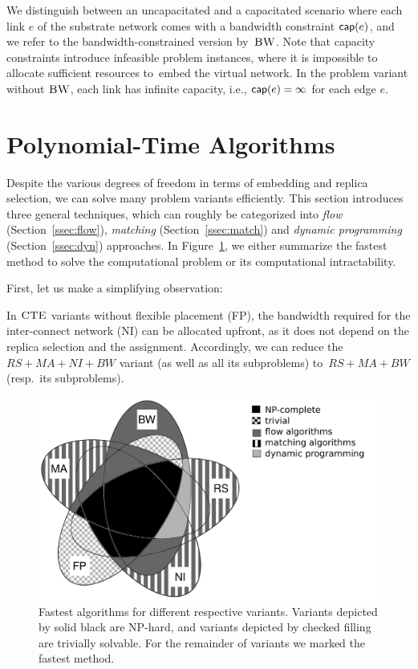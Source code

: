 We distinguish between an uncapacitated and a capacitated scenario where each link $e$
of the substrate network comes with a bandwidth
constraint $\textsf{cap}(e)$, and we refer to the bandwidth-constrained version by~$\textsc{BW}$.
Note that capacity constraints introduce infeasible problem instances, where it is impossible to
allocate sufficient resources to~embed the virtual network.
In the problem variant without $\textsc{BW}$, each link has infinite capacity, i.e., $\textsf{cap}(e) = \infty$ for each edge $e$.

\section{Polynomial-Time Algorithms}\label{sec:poly}


Despite the various degrees of freedom in terms of embedding and replica selection,
we can solve many problem variants efficiently.
 This section introduces three general techniques,
 which can roughly be categorized into
 \emph{flow} (Section~\ref{ssec:flow}), \emph{matching} (Section~\ref{ssec:match}) and \emph{dynamic programming}
 (Section~\ref{ssec:dyn}) approaches.
In Figure~\ref{fig:venn_full}, we either summarize the fastest method to solve the computational problem or its computational intractability.
 
First, let us make a simplifying observation:
\begin{obs}\label{obs:nofp}
In $\textsc{CTE}$ variants without flexible placement (FP),
the bandwidth required
for the inter-connect network (NI) can be allocated upfront, 
as it
does not depend on the replica
selection and the assignment.
Accordingly, we can reduce the $RS+MA+NI+BW$ variant (as well as all its subproblems)
to~$RS+MA+BW$ (resp.~its subproblems).
\end{obs}

\begin{figure}[t]
\centering
\includegraphics[width=0.69\columnwidth]{figs/static-mapping/venn_full2}
\caption{Fastest algorithms for different respective variants. Variants depicted by solid black are NP-hard, and variants depicted by checked filling are trivially solvable. For the remainder of variants we marked the fastest method.}
\label{fig:venn_full}
\end{figure}



